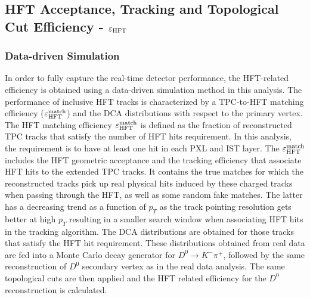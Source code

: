 \documentclass[%
 reprint,	
 amsmath,amssymb,
 aps,
 prc,
]{revtex4-1}
\begin{document}
\subsection{HFT Acceptance, Tracking and Topological Cut Efficiency - $\varepsilon_{\rm HFT}$}
\label{correction:hft}

\subsubsection{Data-driven Simulation} 
\label{correction:hft:fastsim}

In order to fully capture the real-time detector performance, the HFT-related efficiency is obtained using a data-driven simulation method in this analysis. The performance of inclusive HFT tracks is characterized by a TPC-to-HFT matching efficiency ($\varepsilon_{\rm HFT}^{\rm match}$) and the DCA distributions with respect to the primary vertex. The HFT matching efficiency $\varepsilon_{\rm HFT}^{\rm match}$ is defined as the fraction of reconstructed TPC tracks that satisfy the number of HFT hits requirement. In this analysis, the requirement is to have at least one hit in each PXL and IST layer. The $\varepsilon_{\rm HFT}^{\rm match}$ includes the HFT geometric acceptance and the tracking efficiency that associate HFT hits to the extended TPC tracks. It contains the true matches for which the reconstructed tracks pick up real physical hits induced by these charged tracks when passing through the HFT, as well as some random fake matches. The latter has a decreasing trend as a function of $p_T$ as the track pointing resolution gets better at high $p_T$ resulting in a smaller search window when associating HFT hits in the tracking algorithm. The DCA distributions are obtained for those tracks that satisfy the HFT hit requirement. These distributions obtained from real data are fed into a Monte Carlo decay generator for $D^0\rightarrow K^-\pi^+$, followed by the same reconstruction of $D^0$ secondary vertex as in the real data analysis. The same topological cuts are then applied and the HFT related efficiency for the $D^0$ reconstruction is calculated.

\end{document}
